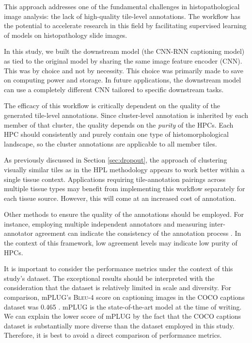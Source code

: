 \documentclass{l4proj}
\begin{document}
This approach addresses one of the fundamental challenges in histopathological image analysis: the lack of high-quality tile-level annotations. The workflow has the potential to accelerate research in this field by facilitating supervised learning of models on histopathology slide images.

In this study, we built the downstream model (the CNN-RNN captioning model) as tied to the original model by sharing the same image feature encoder (CNN). This was by choice and not by necessity. This choice was primarily made to save on computing power and storage. In future applications, the downstream model can use a completely different CNN tailored to specific downstream tasks.

The efficacy of this workflow is critically dependent on the quality of the generated tile-level annotations. Since cluster-level annotation is inherited by each member of that cluster, the quality depends on the \emph{purity} of the HPCs. Each HPC should consistently and purely contain one type of histomorphological landscape, so the cluster annotations are applicable to all member tiles.

As previously discussed in Section \ref{sec:dropout}, the approach of clustering visually similar tiles as in the HPL methodology appears to work better within a single tissue context. Applications requiring tile-annotation pairings across multiple tissue types may benefit from implementing this workflow separately for each tissue source. However, this will come at an increased cost of annotation.

Other methods to ensure the quality of the annotations should be employed. For instance, employing multiple independent annotators and measuring inter-annotator agreement can indicate the consistency of the annotation process \citep{Artstein2017}. In the context of this framework, low agreement levels may indicate low purity of HPCs. 

It is important to consider the performance metrics under the context of this study's dataset. The exceptional results should be interpreted with the consideration that the dataset is relatively limited in scale and diversity. For comparison, mPLUG's \textsc{Bleu-4} score on captioning images in the COCO captions dataset was 0.465 \citep{mplug}. mPLUG is the state-of-the-art model at the time of writing. We can explain the lower score of mPLUG by the fact that the COCO captions dataset is substantially more diverse than the dataset employed in this study. Therefore, it is best to avoid a direct comparison of performance metrics.
\end{document}
